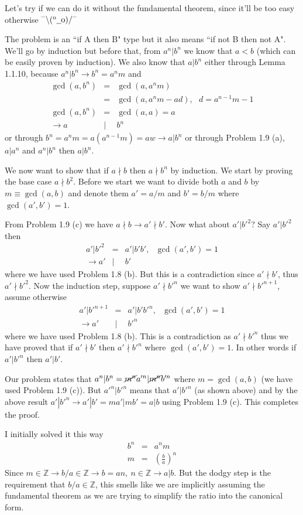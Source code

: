 \documentclass[aps,preprint,preprintnumbers,nofootinbib,showpacs,prd]{revtex4-1}
\newcommand{\nbea}{\begin{eqnarray*}}
\newcommand{\neea}{\end{eqnarray*}}
\newcommand{\dunno}{$ {}^{\mbox {--}}\backslash(^{\rm o}{}\underline{\hspace{0.2cm}}{\rm o})/^{\mbox {--}}$}
\begin{document}
Let's try if we can do it without the fundamental theorem, since it'll be too easy otherwise \dunno

The problem is an ``if A then B" type but it also means ``if not B then not A". We'll go by induction but before that, from $a^n | b^n$ we know that $a < b$ (which can be easily proven by induction). We also know that $a|b^n$ either through Lemma 1.1.10, because $a^n|b^n \to b^n = a^n m$ and
%
\nbea
\gcd(a,b^n) & = & \gcd(a, a^n m)\\
& = & \gcd(a, a^n m - ad), ~~~ d = a^{n-1}m - 1 \\
\gcd(a,b^n) & = & \gcd(a, a) = a \\
\to a & | & b^n
\neea
%
or through $b^n = a^n m = a (a^{n-1}m) = a w \to a|b^n$ or through Problem 1.9 (a), $a|a^n$ and $a^n|b^n$ then $a|b^n$.

We now want to show that if $a \nmid b$ then $a \nmid b^n$ by induction. We start by proving the base case $a \nmid b^2$. Before we start we want to divide both $a$ and $b$ by $m \equiv \gcd(a,b)$ and denote them $a' = a/m$ and $b'=b/m$ where $\gcd(a',b') = 1$.

From Problem 1.9 (c) we have $a \nmid b \to a' \nmid b'$. Now what about $a'|b'^2$? Say $a' | b'^2$ then
%
\nbea
a'|b'^2 & = & a' | b' b', ~~~\gcd(a',b') = 1 \\
\to a' & | & b'
\neea
%
where we have used Problem 1.8 (b). But this is a contradiction since $a' \nmid b'$, thus $a' \nmid b'^2$. Now the induction step, suppose $a' \nmid b'^n$ we want to show $a' \nmid b'^{n+1}$, assume otherwise
%
\nbea
a'|b'^{n+1} & = & a' | b' b'^n, ~~~\gcd(a',b') = 1 \\
\to a' & | & b'^n
\neea
%
where we have used Problem 1.8 (b). This is a contradiction as $a' \nmid b'^n$ thus we have proved that if $a' \nmid b'$ then $a' \nmid b'^n$ where $\gcd(a',b')=1$. In other words if $a' | b'^n$ then $a' | b'$.

Our problem states that $a^n | b^n = \cancel{m^n} a'^n | \cancel{m^n} b'^n$ where $m = \gcd(a,b)$ (we have used Problem 1.9 (c)). But $a'^n | b'^n$ means that $a' | b'^n$ (as shown above) and by the above result $a' | b'^n \to a'|b' = ma'|mb' = a|b$ using Problem 1.9 (c). This completes the proof.

I initially solved it this way
%
\nbea
b^n & = & a^n  m \\
m & = & \left(\frac{b}{a} \right)^n
\neea
%
Since $m \in \mathbb{Z} \to b/a \in \mathbb{Z} \to b = an,~n \in \mathbb{Z} \to a|b$. But the dodgy step is the requirement that $b/a \in \mathbb{Z}$, this smells like we are implicitly assuming the fundamental theorem as we are trying to simplify the ratio into the canonical form.
\end{document}
